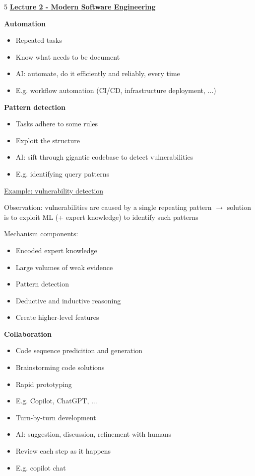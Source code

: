 \documentclass[landscape,a4paper]{extarticle}
\begin{document}
\begin{multicols*}{5}
    \uline{\textbf{Lecture 2 - Modern Software Engineering}}

    \textbf{Automation}
    \begin{itemize}
        \item Repeated tasks
        \item Know what needs to be document
        \item AI: automate, do it efficiently and reliably, every time
        \item E.g. workflow automation (CI/CD, infrastructure deployment, ...)
    \end{itemize}

    \textbf{Pattern detection}
    \begin{itemize}
        \item Tasks adhere to some rules
        \item Exploit the structure
        \item AI: sift through gigantic codebase to detect vulnerabilities
        \item E.g. identifying query patterns
    \end{itemize}

    \uline{Example: vulnerability detection}

    Observation: vulnerabilities are caused by a single repeating pattern $\rightarrow$ solution is
    to exploit ML (+ expert knowledge) to identify such patterns

    Mechanism components:
    \begin{itemize}
        \item Encoded expert knowledge
        \item Large volumes of weak evidence
        \item Pattern detection
        \item Deductive and inductive reasoning
        \item Create higher-level features
    \end{itemize}

    \textbf{Collaboration}
    \begin{itemize}
        \item Code sequence predicition and generation
        \item Brainstorming code solutions
        \item Rapid prototyping
        \item E.g. Copilot, ChatGPT, ...
        \item Turn-by-turn development
        \item AI: suggestion, discussion, refinement with humans
        \item Review each step as it happens
        \item E.g. copilot chat
    \end{itemize}


\end{multicols*}
\end{document}
